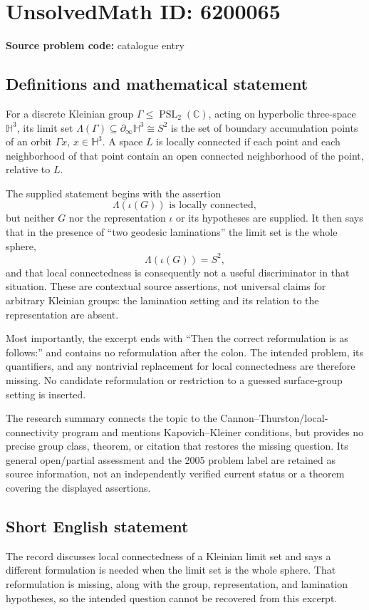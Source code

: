 \documentclass[11pt]{article}
\begin{document}
\section*{UnsolvedMath ID: 6200065}
\textbf{Source problem code:} catalogue entry
\subsection{Definitions and mathematical statement}
For a discrete Kleinian group \(\Gamma\le\operatorname{PSL}_2(\mathbb C)\), acting on hyperbolic three-space \(\mathbb H^3\), its limit set \(\Lambda(\Gamma)\subseteq\partial_\infty\mathbb H^3\cong S^2\) is the set of boundary accumulation points of an orbit \(\Gamma x\), \(x\in\mathbb H^3\). A space \(L\) is locally connected if each point and each neighborhood of that point contain an open connected neighborhood of the point, relative to \(L\).

The supplied statement begins with the assertion
\[
 \Lambda(\iota(G))\text{ is locally connected},
\]
but neither \(G\) nor the representation \(\iota\) or its hypotheses are supplied. It then says that in the presence of ``two geodesic laminations'' the limit set is the whole sphere,
\[
 \Lambda(\iota(G))=S^2,
\]
and that local connectedness is consequently not a useful discriminator in that situation. These are contextual source assertions, not universal claims for arbitrary Kleinian groups: the lamination setting and its relation to the representation are absent.

Most importantly, the excerpt ends with ``Then the correct reformulation is as follows:'' and contains no reformulation after the colon. The intended problem, its quantifiers, and any nontrivial replacement for local connectedness are therefore missing. No candidate reformulation or restriction to a guessed surface-group setting is inserted.

The research summary connects the topic to the Cannon--Thurston/local-connectivity program and mentions Kapovich--Kleiner conditions, but provides no precise group class, theorem, or citation that restores the missing question. Its general open/partial assessment and the 2005 problem label are retained as source information, not an independently verified current status or a theorem covering the displayed assertions.
\subsection{Short English statement}
The record discusses local connectedness of a Kleinian limit set and says a different formulation is needed when the limit set is the whole sphere. That reformulation is missing, along with the group, representation, and lamination hypotheses, so the intended question cannot be recovered from this excerpt.
\end{document}
